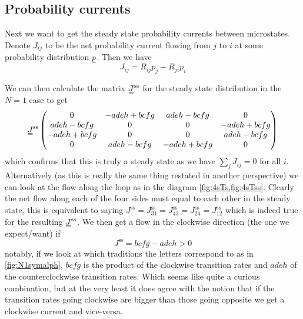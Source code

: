 \documentclass[11pt]{article}
\newcommand{\suf}[2]{\stackunder[0.5pt]{\stackunder[1pt]{\ensuremath{#1}}{\rule{\widthof{\ensuremath{#2}}*\real{0.9}}{.1ex}}}{}}
\newcommand{\duf}[2]{\stackunder[0.5pt]{\stackunder[0.8pt]{\stackunder[1pt]{\ensuremath{#1}}{\rule{\widthof{\ensuremath{#2}}*\real{0.9}}{.1ex}}}{\rule{\widthof{\ensuremath{#2}}*\real{0.9}}{.1ex}}}{}}
\newcommand{\su}[1]{\suf{#1}{#1}}
\newcommand{\du}[1]{\duf{#1}{#1}}
\begin{document}
\subsection{Probability currents}
Next we want to get the steady state probability currents between microstates.
Denote $J_{ij}$ to be the net probability current flowing from $j$ to $i$ at some probability distribution $\su{p}$.
Then we have 
\begin{equation}\label{eq:current}
    J_{ij} = R_{ij}p_j-R_{ji}p_i
\end{equation}

We can then calculate the matrix $\du{J}^\text{ss}$ for the steady state distribution in the $N=1$ case to get
\begin{equation}
    \du{J}^\text{ss}\begin{pmatrix}
        0 &  - a d e h + b c f g & a d e h - b c f g & 0 \\
        a d e h - b c f g & 0 & 0 &  - a d e h + b c f g \\
         - a d e h + b c f g & 0 & 0 & a d e h - b c f g \\
        0 & a d e h - b c f g &  - a d e h + b c f g & 0 \\
    \end{pmatrix}
\end{equation}
which confirms that this is truly a steady state as we have $\sum_j J_{ij} = 0$ for all $i$.
Alternatively (as this is really the same thing restated in another perspective) we can look at the flow along the loop as in the diagram \cref{fig:4sTs,fig:4sTss}.
Clearly the net flow along each of the four sides must equal to each other in the steady state, this is equivalent to saying $J^\text{ss}=J^\text{ss}_{31}=J^\text{ss}_{43}=J^\text{ss}_{24}=J^\text{ss}_{12}$ which is indeed true for the resulting $\du{J}^\text{ss}$.
We then get a flow in the clockwise direction (the one we expect/want) if
\begin{equation}
    J^\text{ss}=bcfg-adeh > 0
\end{equation}
notably, if we look at which traditions the letters correspond to as in \cref{fig:N1symalph}, $bcfg$ is the product of the clockwise transition rates and $adeh$ of the counterclockwise transition rates.
Which seems like quite a curious combination, but at the very least it does agree with the notion that if the transition rates going clockwise are bigger than those going opposite we get a clockwise current and vice-versa.
\end{document}
